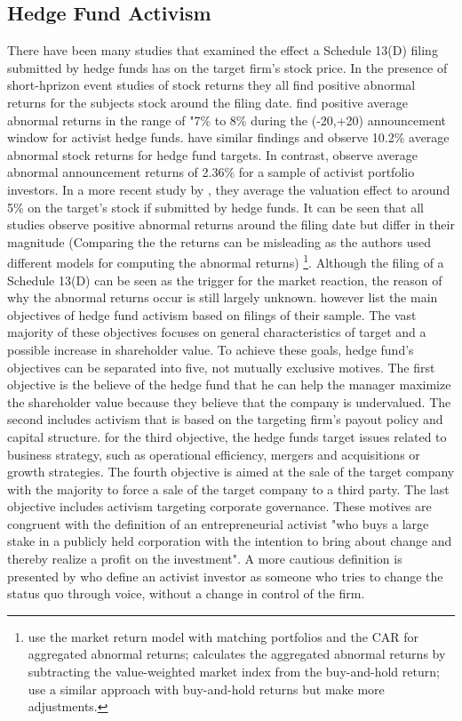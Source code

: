 \documentclass[12pt]{article}
\begin{document}
\subsection{Hedge Fund Activism}
There have been many studies that examined the effect a Schedule 13(D) filing submitted by hedge funds has on the target firm's stock price. In the presence of short-hprizon event studies of stock returns they all find positive abnormal returns for the subjects stock around the filing date. 
\citet[p.1730]{Brav2008} find positive average abnormal returns in the range of "7\% to 8\% during the (-20,+20) announcement window for activist hedge funds. \citet{Klein2009} have similar findings and observe 10.2\% average abnormal stock returns for hedge fund targets. In contrast, \citet{Greenwood2009} observe average abnormal announcement returns of 2.36\% for a sample of activist portfolio investors. In a more recent study by \citet{Denes2017}, they average the valuation effect to around 5\% on the target's stock if submitted by hedge funds. It can be seen that all studies observe positive abnormal returns around the filing date but differ in their magnitude (Comparing the the returns can be misleading as the authors used different models for computing the abnormal returns)
	\footnote{\citet{Greenwood2009} use the market return model with matching portfolios and the CAR for aggregated abnormal returns; \citet{Brav2008} calculates the aggregated abnormal returns by subtracting the value-weighted market index from the buy-and-hold return; \citet{Klein2009} use a similar approach with buy-and-hold returns but make more adjustments.}.
Although the filing of a Schedule 13(D) can be seen as the trigger for the market reaction, the reason of why the abnormal returns occur is still largely unknown. \citet[p.12]{Brav2009} however list the main objectives of hedge fund activism based on filings of their sample. The vast majority of these objectives focuses on general characteristics of target and a possible increase in shareholder value. To achieve these goals, hedge fund's objectives can be separated into five, not mutually exclusive motives. The first objective is the believe of the hedge fund that he can help the manager maximize the shareholder value because they believe that the company is undervalued. The second includes activism that is based on the targeting firm's payout policy and capital structure. for the third objective, the hedge funds target issues related to business strategy, such as operational efficiency, mergers and acquisitions or growth strategies. The fourth objective is aimed at the sale of the target company with the majority to force a sale of the target company to a third party. The last objective includes activism targeting corporate governance. These motives are congruent with the \citet{Klein2009} definition of an entrepreneurial activist "who buys a large stake in a publicly held corporation with the intention to bring about change and thereby realize a profit on the investment". A more cautious definition is presented by \citet{Greenwood2009} who define an activist investor as someone who tries to change the status quo through voice, without a change in control of the firm. 
\end{document}
